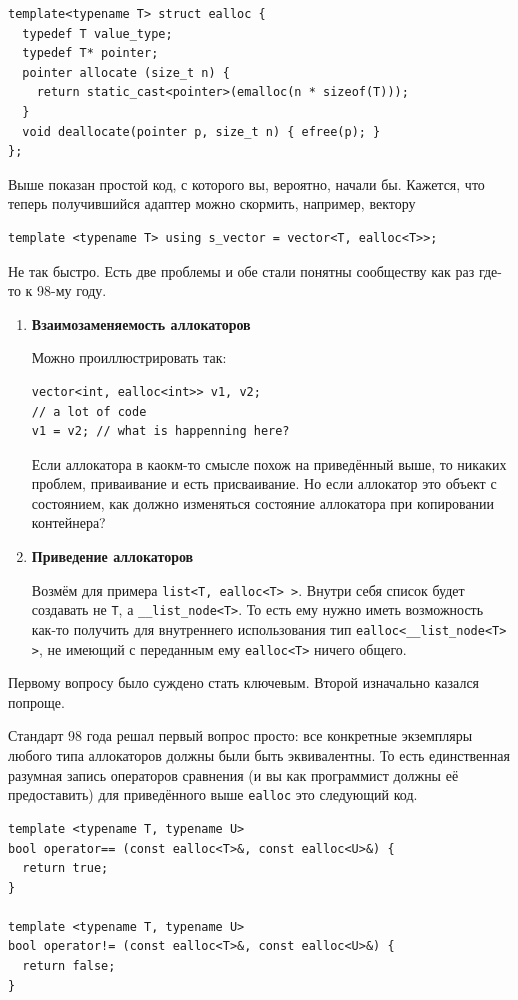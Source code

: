 \documentclass[a4paper,12pt,oneside]{book}
\begin{document}
\begin{lstlisting}
template<typename T> struct ealloc {
  typedef T value_type;
  typedef T* pointer;
  pointer allocate (size_t n) { 
    return static_cast<pointer>(emalloc(n * sizeof(T)));
  }
  void deallocate(pointer p, size_t n) { efree(p); }
};
\end{lstlisting}

Выше показан простой код, с которого вы, вероятно, начали бы. Кажется, что теперь получившийся адаптер можно скормить, например, вектору

\begin{lstlisting}
template <typename T> using s_vector = vector<T, ealloc<T>>;
\end{lstlisting}

Не так быстро. Есть две проблемы и обе стали понятны сообществу как раз где-то к 98-му году.

\begin{enumerate}
\item \textbf{Взаимозаменяемость аллокаторов}

Можно проиллюстрировать так:
\begin{lstlisting}
vector<int, ealloc<int>> v1, v2;
// a lot of code
v1 = v2; // what is happenning here?
\end{lstlisting}
Если аллокатора в каокм-то смысле похож на приведённый выше, то никаких проблем, приваивание и есть присваивание. Но если аллокатор это объект с состоянием, как должно изменяться состояние аллокатора при копировании контейнера?
\item \textbf{Приведение аллокаторов}

Возмём для примера \lstinline!list<T, ealloc<T> >!. Внутри себя список будет создавать не \lstinline!T!, а \lstinline!__list_node<T>!. То есть ему нужно иметь возможность как-то получить для внутреннего использования тип \lstinline!ealloc<__list_node<T> >!, не имеющий с переданным ему \lstinline!ealloc<T>! ничего общего.
\end{enumerate}

Первому вопросу было суждено стать ключевым. Второй изначально казался попроще.

Стандарт 98 года решал первый вопрос просто: все конкретные экземпляры любого типа аллокаторов должны были быть эквивалентны. То есть единственная разумная запись операторов сравнения (и вы как программист должны её предоставить) для приведённого выше \lstinline!ealloc! это следующий код.

\begin{lstlisting}
template <typename T, typename U>
bool operator== (const ealloc<T>&, const ealloc<U>&) {
  return true;
}

template <typename T, typename U>
bool operator!= (const ealloc<T>&, const ealloc<U>&) {
  return false;
}
\end{lstlisting}
\end{document}

